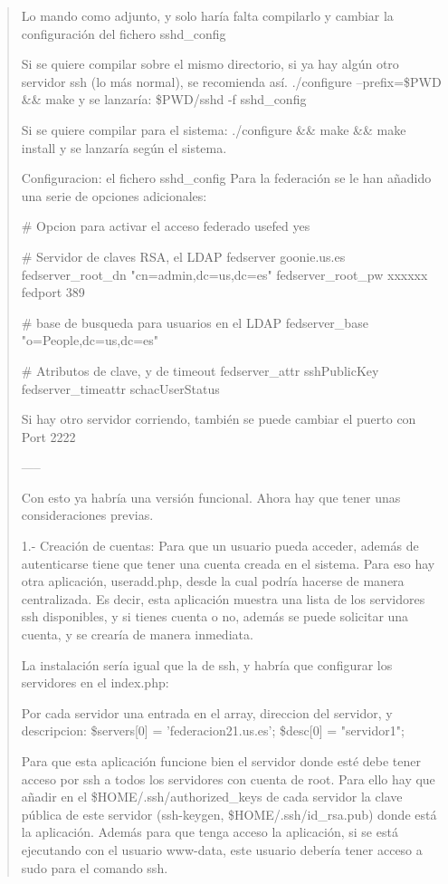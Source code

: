 \begin{quote}
Lo mando como adjunto, y solo haría falta compilarlo y cambiar la
configuración del fichero sshd\_config

Si se quiere compilar sobre el mismo directorio, si ya hay algún otro
servidor ssh (lo más normal), se recomienda así.
./configure --prefix=\$PWD \&\& make
y se lanzaría:
\$PWD/sshd -f sshd\_config

Si se quiere compilar para el sistema:
./configure \&\& make \&\& make install
y se lanzaría según el sistema.

Configuracion: el fichero sshd\_config
Para la federación se le han añadido una serie de opciones adicionales:

\# Opcion para activar el acceso federado
usefed yes

\# Servidor de claves RSA, el LDAP
fedserver goonie.us.es
fedserver\_root\_dn "cn=admin,dc=us,dc=es"
fedserver\_root\_pw xxxxxx
fedport 389

\# base de busqueda para usuarios en el LDAP
fedserver\_base "o=People,dc=us,dc=es"

\# Atributos de clave, y de timeout
fedserver\_attr sshPublicKey
fedserver\_timeattr schacUserStatus

Si hay otro servidor corriendo, también se puede cambiar el puerto con
Port 2222

-----

Con esto ya habría una versión funcional. Ahora hay que tener unas
consideraciones previas.

1.- Creación de cuentas:
Para que un usuario pueda acceder, además de autenticarse tiene que
tener una cuenta creada en el sistema. Para eso hay otra aplicación,
useradd.php, desde la cual podría hacerse de manera centralizada. Es
decir, esta aplicación muestra una lista de los servidores ssh
disponibles, y si tienes cuenta o no, además se puede solicitar una
cuenta, y se crearía de manera inmediata.

La instalación sería igual que la de ssh, y habría que configurar los
servidores en el index.php:

Por cada servidor una entrada en el array, direccion del servidor, y
descripcion:
\$servers[0] = 'federacion21.us.es';
\$desc[0] = "servidor1";

Para que esta aplicación funcione bien el servidor donde esté debe
tener acceso por ssh a todos los servidores con cuenta de root. Para
ello hay que añadir en el \$HOME/.ssh/authorized\_keys de cada servidor la
clave pública de este servidor (ssh-keygen, \$HOME/.ssh/id\_rsa.pub) donde
está la aplicación.
Además para que tenga acceso la aplicación, si se está ejecutando con el
usuario www-data, este usuario debería tener acceso a sudo para el
comando ssh.


\end{quote}
